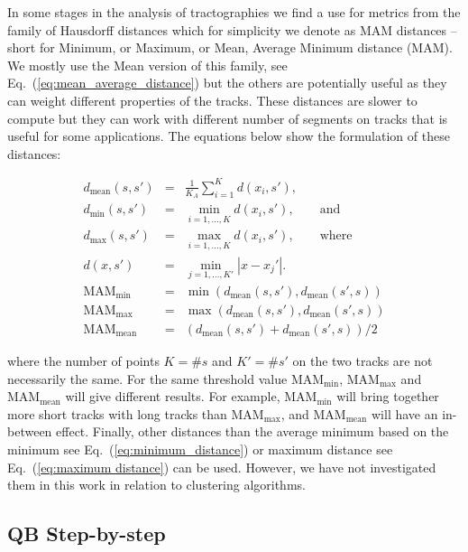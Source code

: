 \documentclass{bioinfo}
\begin{document}
In some stages in the analysis of tractographies we find a use for
metrics from the family of Hausdorff distances which for simplicity we
denote as MAM distances -- short for Minimum, or Maximum, or Mean,
Average Minimum distance (MAM). We mostly use the Mean version of this
family, see Eq.~(\ref{eq:mean_average_distance}) but the others are
potentially useful as they can weight different properties of the
tracks. These distances are slower to compute but they can work with
different number of segments on tracks that is useful for some
applications. The equations below show the formulation of these
distances:

\begin{eqnarray}
d_{\textrm{mean}}(s,s') & = & \frac{1}{K_{A}}\sum_{i=1}^{K}d(x_{i},s'),\nonumber \\
d_{\textrm{min}}(s,s') & = & \min_{i=1,...,K}d(x_{i},s'),\qquad\textrm{and}\label{eq:minimum_distance}\\
d_{\textrm{max}}(s,s') & = & \max_{i=1,...,K }d(x_{i},s'),\qquad\textrm{where}\label{eq:maximum distance}\\
d(x,s') & = & \min_{j=1,...,K'}|x-x_{j}'|.\nonumber \\
\textrm{MAM}_{\textrm{min}} & = & \min(d_{\textrm{mean}}(s,s'),d_{\textrm{mean}}(s',s))\label{eq:min_average_distance}\\
\textrm{MAM}_{\textrm{max}} & = & \max(d_{\textrm{mean}}(s,s'),d_{\textrm{mean}}(s',s))\nonumber \\
\textrm{MAM}_{\textrm{mean}} & = & (d_{\textrm{mean}}(s,s')+d_{\textrm{mean}}(s',s))/2\label{eq:mean_average_distance}\end{eqnarray}


\noindent
where the number of points $K=\#s$ and $K'=\#s'$ on the two tracks
are not necessarily the same. For the same threshold value $\textrm{MAM}_{\textrm{min}}$,
$\textrm{MAM}_{\textrm{max}}$ and $\textrm{MAM}_{\textrm{mean}}$
will give different results. For example, $\textrm{MAM}_{\textrm{min}}$ will
bring together more short tracks with long tracks than $\textrm{MAM}_{\textrm{max}}$,
and 
$\textrm{MAM}_{\textrm{mean}}$ 
will have an in-between effect. Finally, other distances than the average
minimum based on the minimum see Eq.~(\ref{eq:minimum_distance})
or maximum distance see Eq.~(\ref{eq:maximum distance}) can be used.
However, we have not investigated them in this work in relation to
clustering algorithms.

\subsection{QB Step-by-step\label{sub:QB_step_by_step}}
\end{document}
